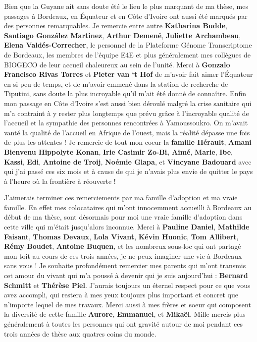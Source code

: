 \documentclass[12pt,twoside,a4paper, a]{article}
\begin{document}
Bien que la Guyane ait sans doute été le lieu le plus marquant de ma
thèse, mes passages à Bordeaux, en Équateur et en Côte d'Ivoire ont
aussi été marqués par des personnes remarquables. Je remercie entre
autre \textbf{Katharina Budde}, \textbf{Santiago González Martinez}, \textbf{Arthur
Demené}, \textbf{Juliette Archambeau}, \textbf{Elena Valdés-Correcher},
le personnel de la Plateforme Génome Transcriptome de Bordeaux,
les membres de l'équipe E4E et plus généralement mes collègues de BIOGECO
de leur accueil chaleureux au sein de l'unité. Merci à \textbf{Gonzalo Francisco
Rivas Torres} et \textbf{Pieter van `t Hof} de m'avoir fait aimer
l'Équateur en si peu de temps, et de m'avoir emmené dans la station de
recherche de Tiputini, sans doute la plus incroyable qu'il m'ait été
donné de connaître. Enfin mon passage en Côte d'Ivoire s'est aussi bien
déroulé malgré la crise sanitaire qui m'a contraint à y rester plus
longtemps que prévu grâce à l'incroyable qualité de l'accueil et la
sympathie des personnes rencontrées à Yamoussoukro. On m'avait vanté la
qualité de l'accueil en Afrique de l'ouest, mais la réalité dépasse une
fois de plus les attentes ! Je remercie de tout mon coeur la \textbf{famille
Hérault}, \textbf{Amani Bienvenu Hippolyte Konan}, \textbf{Irie Casimir Zo-Bi,
Aimé}, \textbf{Marie}, \textbf{Ibe}, \textbf{Kassi}, \textbf{Edi}, \textbf{Antoine de Troij},
\textbf{Noémie Glapa}, et \textbf{Vincyane Badouard} avec qui j'ai passé ces six
mois et à cause de qui je n'avais plus envie de quitter le pays à
l'heure où la frontière à réouverte !

J'aimerais terminer ces remerciements par ma famille d'adoption et ma
vraie famille. En effet mes colocataires qui m'ont innocemment accueilli
à Bordeaux au début de ma thèse, sont désormais pour moi une vraie
famille d'adoption dans cette ville qui m'était jusqu'alors inconnue.
Merci à \textbf{Pauline Daniel}, \textbf{Mathilde Faisant}, \textbf{Thomas Devaux},
\textbf{Lola Vivant}, \textbf{Kévin Huonic}, \textbf{Tom Allibert}, \textbf{Rémy Boudet},
\textbf{Antoine Buquen}, et les nombreux sous-loc qui ont partagé mon toit au
cours de ces trois années, je ne peux imaginer une vie à Bordeaux sans
vous ! Je souhaite profondément remercier mes parents qui m'ont transmis
cet amour du vivant qui m'a poussé à devenir qui je suis aujourd'hui :
\textbf{Bernard Schmitt} et \textbf{Thérèse Piel}. J'aurais toujours un éternel
respect pour ce que vous avez accompli, qui restera à mes yeux toujours
plus important et concret que n'importe lequel de mes travaux. Merci
aussi à mes frères et soeur qui composent la diversité de cette famille
\textbf{Aurore}, \textbf{Emmanuel}, et \textbf{Mikaël}. Mille mercis plus généralement
à toutes les personnes qui ont gravité autour de moi pendant ces trois
années de thèse aux quatres coins du monde.
\end{document}
